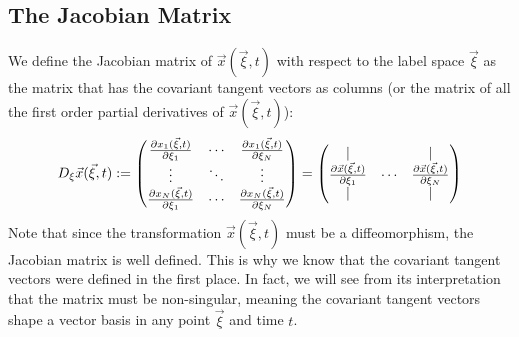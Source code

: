 \documentclass[11pt, a4paper]{article} %
\begin{document}
\subsection*{The Jacobian Matrix}
We define the Jacobian matrix of $\vec{x}(\vec{\xi},t)$ with respect to the label space $\vec{\xi}$ as the matrix that has the covariant tangent vectors as columns (or the matrix of all the first order partial derivatives of $\vec{x}(\vec{\xi},t)$):
\begin{equation}
D_\xi\vec{x}(\vec{\xi},t):=\begin{pmatrix}
\pdv{x_1(\vec{\xi},t)}{\xi_1} & \cdots & \pdv{x_1(\vec{\xi},t)}{\xi_N}\\
\vdots&\ddots&\vdots \\
\pdv{x_N(\vec{\xi},t)}{\xi_1} & \cdots & \pdv{x_N(\vec{\xi},t)}{\xi_N}
\end{pmatrix}=\begin{pmatrix}
|& &|\\
\pdv{\vec{x}(\vec{\xi},t)}{\xi_1} & \cdots & \pdv{\vec{x}(\vec{\xi},t)}{\xi_N}\\
|& &|
\end{pmatrix}
\end{equation}
Note that since the transformation $\vec{x}(\vec{\xi},t)$ must be a diffeomorphism, the Jacobian matrix is well defined. This is why we know that the covariant tangent vectors were defined in the first place. In fact, we will see from its interpretation that the matrix must be non-singular, meaning the covariant tangent vectors shape a vector basis in any point $\vec{\xi}$ and time $t$.
\end{document}
